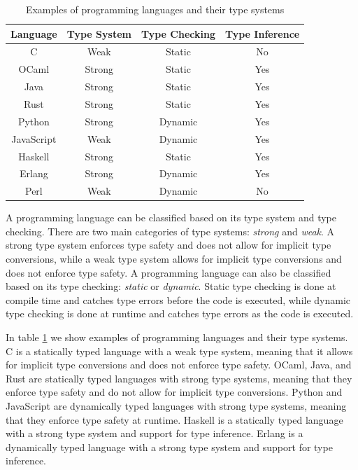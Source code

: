 \begin{table}[t]
    \centering
    \begin{tabular}{ c c c c }
        \\\toprule \textbf{Language} & \textbf{Type System} & \textbf{Type Checking} & \textbf{Type Inference} \\
        \midrule
        C & Weak & Static & No \\
        OCaml & Strong & Static & Yes \\
        Java & Strong & Static  & Yes \\
        Rust & Strong & Static  & Yes \\
        Python & Strong & Dynamic  & Yes \\
        JavaScript & Weak & Dynamic  & Yes \\
        Haskell & Strong & Static  & Yes \\
        Erlang & Strong & Dynamic  & Yes \\
        Perl & Weak & Dynamic  & No \\
        \bottomrule
    \end{tabular}
    \caption{Examples of programming languages and their type systems}
    \label{tab:TypeSystems}
\end{table}

A programming language can be classified based on its type system and type checking. There are two main categories of type systems: \textit{strong} and \textit{weak}. A strong type system enforces type safety and does not allow for implicit type conversions, while a weak type system allows for implicit type conversions and does not enforce type safety. A programming language can also be classified based on its type checking: \textit{static} or \textit{dynamic}. Static type checking is done at compile time and catches type errors before the code is executed, while dynamic type checking is done at runtime and catches type errors as the code is executed.

In table \ref{tab:TypeSystems} we show examples of programming languages and their type systems. C is a statically typed language with a weak type system, meaning that it allows for implicit type conversions and does not enforce type safety. OCaml, Java, and Rust are statically typed languages with strong type systems, meaning that they enforce type safety and do not allow for implicit type conversions. Python and JavaScript are dynamically typed languages with strong type systems, meaning that they enforce type safety at runtime. Haskell is a statically typed language with a strong type system and support for type inference. Erlang is a dynamically typed language with a strong type system and support for type inference.

